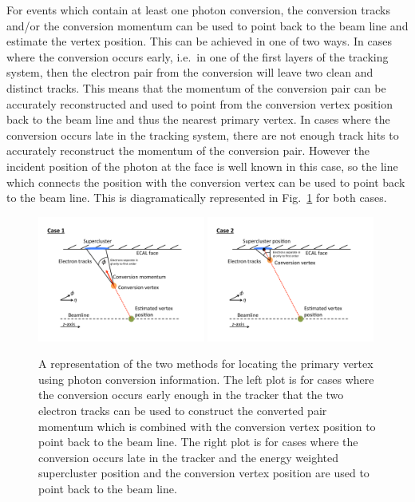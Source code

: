 For events which contain at least one photon conversion, the conversion tracks and/or the conversion momentum can be used to point back to the beam line and estimate the vertex position. This can be achieved in one of two ways. In cases where the conversion occurs early, i.e.\ in one of the first layers of the tracking system, then the electron pair from the conversion will leave two clean and distinct tracks. This means that the momentum of the conversion pair can be accurately reconstructed and used to point from the conversion vertex position back to the beam line and thus the nearest primary vertex. In cases where the conversion occurs late in the tracking system, there are not enough track hits to accurately reconstruct the momentum of the conversion pair. However the incident position of the photon at the \ECAL face is well known in this case, so the line which connects the \ECAL position with the conversion vertex can be used to point back to the beam line. This is diagramatically represented in Fig.~\ref{fig:conv_diags} for both cases.

\begin{figure}
  \includegraphics[width=0.49\textwidth]{analysis_comps/plots/ConvDiagNewCase1.pdf}
  \includegraphics[width=0.49\textwidth]{analysis_comps/plots/ConvDiagNewCase2.pdf}
  \caption[A schematic showing the two methods used for locating the primary vertex]{A representation of the two methods for locating the primary vertex using photon conversion information. The left plot is for cases where the conversion occurs early enough in the tracker that the two electron tracks can be used to construct the converted pair momentum which is combined with the conversion vertex position to point back to the beam line. The right plot is for cases where the conversion occurs late in the tracker and the energy weighted supercluster position and the conversion vertex position are used to point back to the beam line.}
  \label{fig:conv_diags}
\end{figure}

